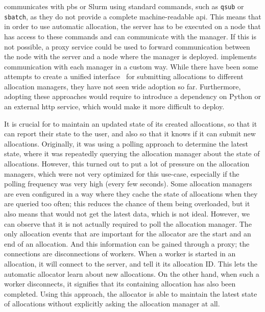 \hyperqueue{} communicates with \gls{pbs} or Slurm using standard
commands, such as \texttt{qsub} or \texttt{sbatch}, as they do not provide a
complete machine-readable \gls{api}. This means that in order to use automatic
allocation, the server has to be executed on a node that has access to these commands and can
communicate with the manager. If this is not possible, a proxy service could be used to forward
communication between the node with the server and a node where the manager is deployed.
\hyperqueue{} implements communication with each manager in a custom way. While there
have been some attempts to create a unified interface~\cite{psij,workflow-alloc-manager-comm} for submitting
allocations to different allocation managers, they have not seen wide adoption so far. Furthermore,
adopting these approaches would require \hq{} to introduce a dependency on Python
or an external \gls{http} service, which would make it more difficult to deploy.

It is crucial for \autoalloc{} to maintain an updated state of its created allocations,
so that it can report their state to the user, and also so that it knows if it can submit new
allocations. Originally, it was using a polling approach to determine the latest state, where it
was repeatedly querying the allocation manager about the state of allocations. However, this turned
out to put a lot of pressure on the allocation managers, which were not very optimized for this
use-case, especially if the polling frequency was very high (every few seconds). Some allocation
managers are even configured in a way where they cache the state of allocations when they are
queried too often; this reduces the chance of them being overloaded, but it also means that
\hyperqueue{} would not get the latest data, which is not ideal. However, we can observe
that it is not actually required to poll the allocation manager. The only allocation events that
are important for the allocator are the start and an end of an allocation. And this information can
be gained through a proxy; the connections are disconnections of \hq{} workers.
When a worker is started in an allocation, it will connect to the server, and tell it its
allocation ID\@. This lets the automatic allocator learn about new allocations. On the other hand,
when such a worker disconnects, it signifies that its containing allocation has also been
completed. Using this approach, the allocator is able to maintain the latest state of allocations
without explicitly asking the allocation manager at all.


